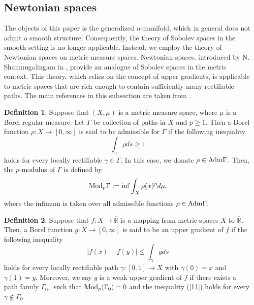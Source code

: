 \documentclass[11pt,twoside]{article}
\theoremstyle{definition}
\newtheorem{defn}{Definition}[section]
\theoremstyle{remark}
\begin{document}
\subsection{Newtonian spaces}
The objects of this paper is the generalized $n$-manifold, which in general does not admit a smooth structure. Consequently, the theory of Sobolev spaces in the smooth setting is no longer applicable. Instead, we employ the theory of Newtonian spaces on metric measure spaces. Newtonian spaces, introduced by N. Shanmugalingam in \cite{Sha00}, provide an analogue of Sobolev spaces in the metric context. This theory, which relies on the concept of upper gradients, is applicable to metric spaces that are rich enough to contain sufficiently many rectifiable paths. The main references  in this subsection are taken from \cite{Sha00,HKST01,HKST15}.
\begin{defn}
Suppose that $(X,\mu)$ is a metric measure space, where $\mu$ is a Borel regular measure. Let $\Gamma$ be  collection of paths in $X$ and $p\geq1.$ Then a Borel function 
$\rho:X\rightarrow[0,\infty]$ is said to be admissible for $\Gamma$  if the following inequality 
$$\int_{\gamma}\rho ds\geq1$$
holds for every locally rectifiable $\gamma\in\Gamma.$ In this case, we donate  $\rho\in{\rm Adm}\Gamma.$ Then, the $p$-modulus of $\Gamma$  is defined by
$${\rm Mod}_{p}\Gamma:=\inf\int_{X}\rho(x)^{p}d\mu,$$
where the infimum is taken over all admissible functions $\rho\in{\rm Adm}\Gamma.$
\end{defn}





\begin{defn}
Suppose that $f:X\rightarrow \overline{\mathbb{R}}$ is a mapping from metric spaces $X$ to $\overline{\mathbb{R}}.$ Then, a Borel function $g:X\rightarrow[0,\infty]$ is said to be an upper gradient of $f$ if the following inequality 
\begin{equation}\label{11}
\vert f(x)-f(y) \vert\leq\int_{\gamma}gds
\end{equation}
holds for every locally rectifiable path $\gamma:[0,1]\rightarrow X$ with $\gamma(0)=x$ and $\gamma(1)=y.$ Moreover, we say $g$ is a weak upper gradient of $f$ if there exists a path family
$\Gamma_{0},$ such that ${\rm Mod}_{p}(\Gamma_{0})=0$ and  the inequality  (\ref{11}) holds for every $\gamma \notin\Gamma_{0}.$
\end{defn}
\end{document}
